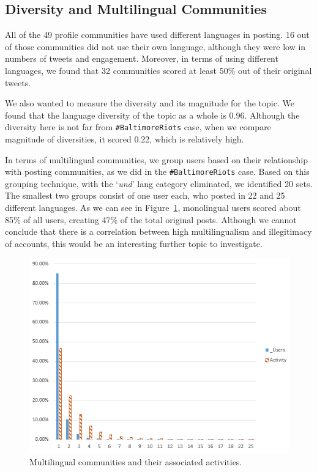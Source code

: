 {\subsection{Diversity and Multilingual Communities}

All of the 49 profile communities have used different languages in
posting. 16 out of those communities did not use their own language,
although they were low in numbers of tweets and engagement. Moreover,
in terms of using different languages, we found that 32 communities
scored at least 50\% out of their original tweets.

We also wanted to measure the diversity and its magnitude for the
topic.  We found that the language diversity of the topic as a whole
is 0.96. Although the diversity here is not far from
{\texttt{\#BaltimoreRiots}} case, when we compare magnitude of
diversities, it scored 0.22, which is relatively high.

In terms of multilingual communities, we group users based on their
relationship with posting communities, as we did in the
{\texttt{\#BaltimoreRiots}} case.  Based on this grouping technique,
with the `{\emph{und}}' lang category eliminated, we identified 20
sets. The smallest two groups consist of one user each, who posted in
22 and 25 different languages.  As we can see in
Figure~\ref{fig:multilingual}, monolingual users scored about 85\% of
all users, creating 47\% of the total original posts. Although we
cannot conclude that there is a correlation between high
multilingualism and illegitimacy of accounts, this would be an
interesting further topic to investigate.

\begin{figure}[htb]
\centering
\includegraphics[width=\columnwidth]{images/multilingualcommunities.png}
\caption{Multilingual communities and their associated activities.}
\label{fig:multilingual}
\end{figure}


}
